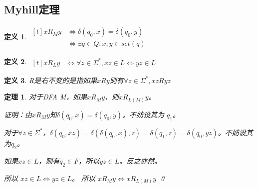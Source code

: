 \documentclass{ctexart}
\newtheorem{definition}{定义}[section]
\newtheorem{theorem}{定理}[section]
\begin{document}
\subsection{Myhill定理}
\begin{definition}
    $\begin{aligned}[t]
        x R_M y & \iff \delta(q_0, x) = \delta(q_0, y) \\
            & \iff \exists q \in Q, x, y \in set(q)
    \end{aligned}$
\end{definition}
\begin{definition}
    $\begin{aligned}[t]
        x R_L y & \iff \forall z \in \Sigma^*, xz \in L \iff yz \in L
    \end{aligned}$
\end{definition}
\begin{definition}
    R是右不变的是指如果$xRy$则有$\forall z \in \Sigma^*, xzRyz$
\end{definition}
\begin{theorem}
    对于DFA M，如果$x R_M y$，则$x R_{L(M)} y$。
    
    证明：由$x R_M y$知$\delta(q_0, x) = \delta(q_0, y)$。不妨设其为
    $q_1$。

    对于$\forall z \in \Sigma^*$，$\delta(q_0, xz) =  \delta(\delta(q_0, x), z) = \delta(q_1, z) 
    = \delta(q_0, yz)$。不妨设其为$q_2$。

    如果$xz \in L$，则有$q_2 \in F$，所以$yz \in L$。反之亦然。

    所以 $xz \in L \iff yz \in L$。
    所以 $x R_M y \iff x R_{L(M)} y$
    \qed
\end{theorem}
\end{document}
